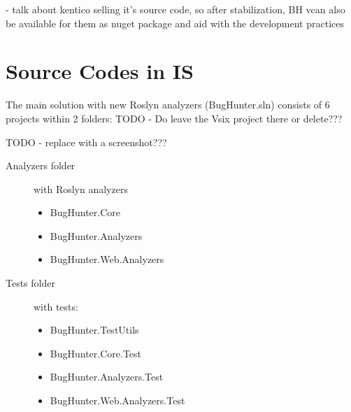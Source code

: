 \documentclass[
  digital, %
  table,   %
  lof,     %
  lot,     %
  oneside,
]{fithesis3}
\begin{document}
- talk about kentico selling it's source code, so after stabilization, BH vcan also be available for them as nuget package and aid with the development practices 

	\makeatletter\thesis@blocks@clear\makeatother

	\printindex
    
  \printbibliography

	\appendix %
  \chapter{Source Codes in IS}
  The main solution with new Roslyn analyzers (BugHunter.sln) consists of 6 projects within 2 folders: TODO - Do leave the Vsix project there or delete???

TODO - replace with a screenshot???
\begin{description}
  \item[Analyzers folder] with Roslyn analyzers
  \begin{itemize}
    \item BugHunter.Core
    \item BugHunter.Analyzers
    \item BugHunter.Web.Analyzers
  \end{itemize}
  
  \item[Tests folder] with tests:
  \begin{itemize}
    \item BugHunter.TestUtils
    \item BugHunter.Core.Test
    \item BugHunter.Analyzers.Test
    \item BugHunter.Web.Analyzers.Test
  \end{itemize}
\end{description}
\end{document}
